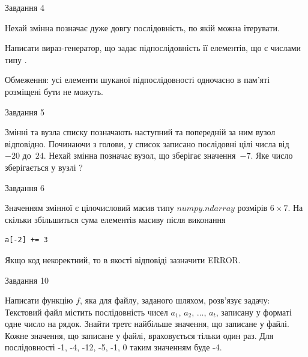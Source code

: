 \documentclass[12pt, ukrainian]{article}
\begin{document}
{\begin{minipage}[t]{8.0cm}
\end{minipage}


               
{\begin{center}Завдання {4}\end{center}}
\vspace{-4mm}
Нехай змінна  позначає дуже довгу послідовність, по якій можна ітерувати.

Написати вираз-генератор, що задає підпослідовність її елементів, що є числами типу .

Обмеження: усі елементи шуканої підпослідовності одночасно в пам'яті розміщені бути не можуть.\par

\vspace{10mm}
               
{\begin{center}Завдання {5}\end{center}}
\vspace{-4mm}
Змінні  та  вузла списку позначають наступний та попередній за ним вузол відповідно. Починаючи з голови, у список записано послідовні цілі числа від~$-20$ до~$24$. Нехай змінна  позначає вузол, що зберігає значення~$-7$.
Яке число зберігається у вузлі  ?\par

               
{\begin{center}Завдання {6}\end{center}}
\vspace{-4mm}
Значенням змінної  є цілочисловий масив типу $numpy.ndarray$ розмірів $6{\times}7$. На скільки збільшиться сума елементів масиву  після виконання
\begin{verbatim}
a[-2] += 3
\end{verbatim}


Якщо код некоректний, то в якості відповіді зазначити ERROR.\par

               
{\begin{center}Завдання {10}\end{center}}
\vspace{-4mm}

Написати функцію $f$, яка для файлу, заданого шляхом, розв’язує задачу:\\ Текстовий файл містить послідовність чисел $a_1$, $a_2$, $\ldots$, $a_t$, записану у форматі одне число на рядок. Знайти третє найбільше значення, що записане у файлі. Кожне значення, що записане у файлі, враховується тільки один раз. Для послідовності -1, -4, -12, -5, -1, 0 таким значенням буде -4.

}
\end{document}
